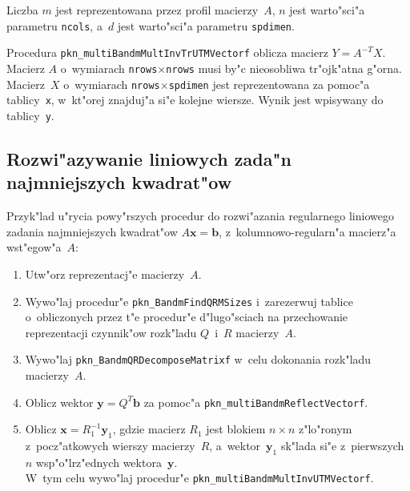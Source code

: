 Liczba $m$ jest reprezentowana przez profil macierzy~$A$, $n$ jest
warto"sci"a parametru \texttt{ncols}, a~$d$ jest warto"sci"a parametru
\texttt{spdimen}.

\vspace{\bigskipamount}
\begin{sloppypar}
Procedura \texttt{pkn\_multiBandmMultInvTrUTMVectorf} oblicza macierz
$Y=A^{-T}X$.
Macierz $A$ o~wymiarach \texttt{nrows}$\times$\texttt{nrows}
musi by"c nieosobliwa tr"ojk"atna g"orna. Macierz~$X$ o~wymiarach
\texttt{nrows}$\times$\texttt{spdimen} jest reprezentowana za pomoc"a
tablicy~\texttt{x}, w~kt"orej znajduj"a si"e kolejne wiersze. Wynik jest
wpisywany do tablicy~\texttt{y}.
\end{sloppypar}


\subsection{\label{ssect:bandm:rlsq}Rozwi"azywanie liniowych zada"n
  najmniejszych kwadrat"ow}

Przyk"lad u"rycia powy"rszych procedur do rozwi"azania regularnego liniowego
zadania najmniejszych kwadrat"ow $A\bm{x}=\bm{b}$, z~kolumnowo-regularn"a
macierz"a wst"egow"a~$A$:
\begin{enumerate}
  \item Utw"orz reprezentacj"e macierzy~$A$.
  \item Wywo"laj procedur"e \texttt{pkn\_BandmFindQRMSizes} i~zarezerwuj
    tablice o~obliczonych przez t"e procedur"e d"lugo"sciach na
    przechowanie reprezentacji czynnik"ow rozk"ladu $Q$~i~$R$ macierzy~$A$.
  \item Wywo"laj \texttt{pkn\_BandmQRDecomposeMatrixf} w~celu dokonania
    rozk"ladu macierzy~$A$.
  \item Oblicz wektor $\bm{y}=Q^T\bm{b}$ za pomoc"a
    \texttt{pkn\_multiBandmReflectVectorf}.
  \item\begin{sloppypar}
    Oblicz $\bm{x}=R_1^{-1}\bm{y}_1$, gdzie macierz $R_1$ jest blokiem
    $n\times n$ z"lo"ronym z~pocz"atkowych wierszy macierzy~$R$,
    a~wektor~$\bm{y}_1$ sk"lada si"e z~pierwszych~$n$ wsp"o"lrz"ednych
    wektora~$\bm{y}$. \\ W~tym celu wywo"laj
    procedur"e \texttt{pkn\_multiBandmMultInvUTMVectorf}.%
    \end{sloppypar}
\end{enumerate}

